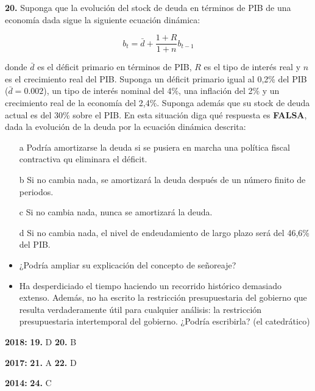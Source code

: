 \documentclass{nuevotema}
\begin{document}

\textbf{20.} Suponga que la evolución del stock de deuda en términos de PIB de una economía dada sigue la siguiente ecuación dinámica:

\begin{equation*}
b_t = \bar{d} + \frac{1+R}{1+n} b_{t-1}
\end{equation*}

donde $\bar{d}$ es el déficit primario en términos de PIB, $R$ es el tipo de interés real y $n$ es el crecimiento real del PIB. Suponga un déficit primario igual al 0,2\% del PIB ($\bar{d}=0.002$), un tipo de interés nominal del 4\%, una inflación del 2\% y un crecimiento real de la economía del 2,4\%. Suponga además que su stock de deuda actual es del 30\% sobre el PIB. En esta situación diga qué respuesta es \textbf{FALSA}, dada la evolución de la deuda por la ecuación dinámica descrita:

\begin{itemize}
	\item[a] Podría amortizarse la deuda si se pusiera en marcha una política fiscal contractiva qu eliminara el déficit.
	\item[b] Si no cambia nada, se amortizará la deuda después de un número finito de periodos.
	\item[c] Si no cambia nada, nunca se amortizará la deuda. 
	\item[d] Si no cambia nada, el nivel de endeudamiento de largo plazo será del 46,6\% del PIB.
\end{itemize}


\begin{itemize}
    \item ¿Podría ampliar su explicación del concepto de señoreaje?
    
    \item Ha desperdiciado el tiempo haciendo un recorrido histórico demasiado extenso. Además, no ha escrito la restricción presupuestaria del gobierno que resulta verdaderamente útil para cualquier análisis: la restricción presupuestaria intertemporal del gobierno. ¿Podría escribirla? (el catedrático)
\end{itemize}

\notas

\textbf{2018:} \textbf{19.} D \textbf{20.} B

\textbf{2017:} \textbf{21.} A \textbf{22.} D

\textbf{2014:} \textbf{24.} C
\end{document}
